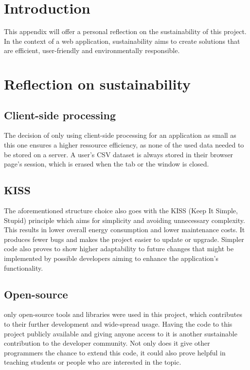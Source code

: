 
\section{Introduction}
This appendix will offer a personal reflection on the sustainability of this project. In the context of a web application, sustainability aims to create solutions that are efficient, user-friendly and environmentally responsible.

\section{Reflection on sustainability}
\subsection{Client-side processing}
The decision of only using client-side processing for an application as small as this one ensures a higher ressource efficiency, as none of the used data needed to be stored on a server. A user's CSV dataset is always stored in their browser page's session, which is erased when the tab or the window is closed. 

\subsection{KISS}
The aforementioned structure choice also goes with the KISS (Keep It Simple, Stupid) principle which aims for simplicity and avoiding unnecessary complexity. This results in lower overall energy consumption and lower maintenance costs. It produces fewer bugs and makes the project easier to update or upgrade. Simpler code also proves to show higher adaptability to future changes that might be implemented by possible developers aiming to enhance the application's functionality.

\subsection{Open-source}
only open-source tools and libraries were used in this project, which contributes to their further development and wide-spread usage. Having the code to this project publicly available and giving anyone access to it is another sustainable contribution to the developer community. Not only does it give other programmers the chance to extend this code, it could also prove helpful in teaching students or people who are interested in the topic.

